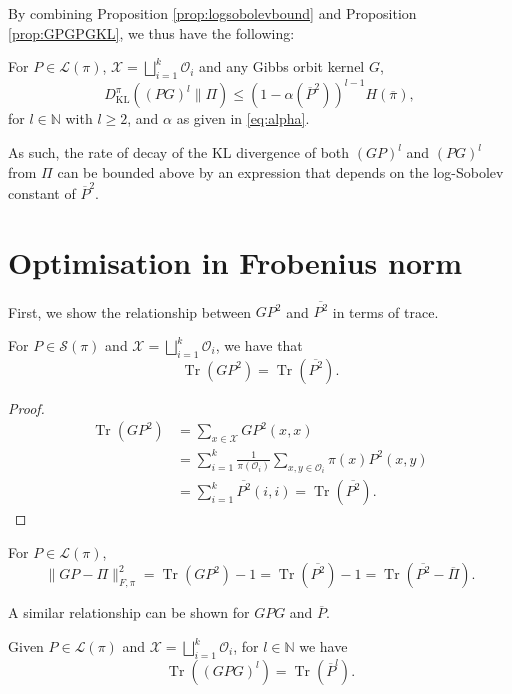 \documentclass[EJP]{ejpecp} %
\DeclareMathOperator{\Tr}{Tr}
\begin{document}
By combining Proposition \ref{prop:logsobolevbound} and Proposition \ref{prop:GPGPGKL}, we thus have the following:
\begin{corollary}
    For $P \in \mathcal{L}(\pi)$, $\mathcal{X} = \bigsqcup_{i=1}^k \mathcal{O}_i$ and any Gibbs orbit kernel $G$,  
    $$D_{\mathrm{KL}}^\pi \left((PG)^l \| \Pi \right) \leq \left(1-\alpha\left(\overline{P}^2\right)\right)^{l-1} H(\overline{\pi}),$$
    for $l \in \mathbb{N}$ with $l \geq 2$, and $\alpha$ as given in \eqref{eq:alpha}.
\end{corollary}

As such, the rate of decay of the KL divergence of both $(GP)^l$ and $(PG)^l$ from $\Pi$ can be bounded above by an expression that depends on the log-Sobolev constant of $\overline{P}^2$.

\section{Optimisation in Frobenius norm} \label{sec:frob}
First, we show the relationship between $GP^2$ and $\overline{P^2}$ in terms of trace. 

\begin{proposition} \label{prop:trace GP^2 = P^2bar}
        For $P\in \mathcal{S}(\pi)$ and $\mathcal{X} = \bigsqcup_{i=1}^k \mathcal{O}_i$, we have that 
        $$\Tr(GP^2) = \Tr(\overline{P^2}).$$
\end{proposition}

\begin{proof}
    \begin{align*}
        \Tr(GP^2) &= \sum_{x\in \mathcal{X}}GP^2(x,x)\\
        &= \sum_{i=1}^k \frac{1}{\pi(\mathcal{O}_i)} \sum_{x, y \in \mathcal{O}_i} \pi(x)P^2(x,y)\\
        &= \sum_{i=1}^k \overline{P^2}(i,i) = \Tr(\overline{P^2}).
    \end{align*}
\end{proof}

\begin{corollary}\label{cor:GPPi}
    For $P\in \mathcal{L}(\pi)$,
    \begin{equation*}
        \|GP- \Pi\|^2_{F,\pi} = \Tr(GP^2) - 1 = \Tr(\overline{P^2}) - 1 =  \Tr(\overline{P^2}- \overline{\Pi}).
    \end{equation*}
\end{corollary}

A similar relationship can be shown for $GPG$ and $\overline{P}$.
\begin{proposition}
    Given $P\in \mathcal{L}(\pi)$ and $\mathcal{X} = \bigsqcup_{i=1}^k \mathcal{O}_i$, for $l \in \mathbb{N}$ we have
    \begin{equation*}
        \Tr((GPG)^l) = \Tr\left(\overline{P}^l\right).
    \end{equation*}
\end{proposition}
\end{document}
